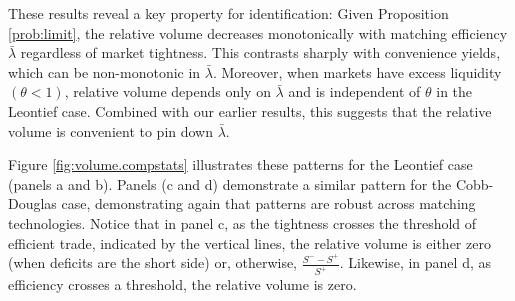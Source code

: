 \documentclass[12pt,american,english,notitlepage]{article}
\begin{document}
These results reveal a key property for identification:
Given Proposition \ref{prob:limit}, the
relative volume
decreases monotonically with matching efficiency $\bar{\lambda}$
regardless of market tightness. This contrasts sharply with convenience
yields, which can be non-monotonic in $\bar{\lambda}$. Moreover,
when markets have excess liquidity $\left(\theta<1\right)$, relative
volume depends only on $\bar{\lambda}$ and is independent of $\theta$
in the Leontief case. Combined with our earlier results, this suggests
that the relative volume is convenient to pin down $\bar{\lambda}$. 

Figure \ref{fig:volume.compstats} illustrates these patterns for
the Leontief case (panels a and b). Panels (c and d) demonstrate a
similar pattern for the Cobb-Douglas case, demonstrating again that
patterns are robust across matching technologies. Notice that in panel c, as the tightness crosses the threshold of efficient trade, indicated by the vertical lines, the relative volume is either zero (when deficits are the short side) or, otherwise, $\frac{S^{-}-S^{+}}{S^{+}}$. Likewise, in panel d, as efficiency crosses a threshold, the relative volume is zero. 
\end{document}
